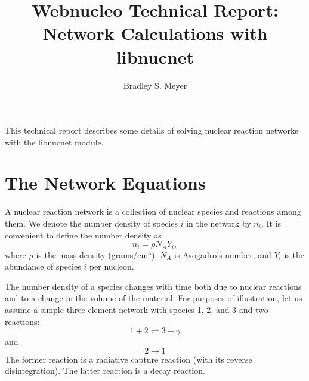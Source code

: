\documentclass{article}    %
\title{Webnucleo Technical Report: Network Calculations with libnucnet}  %
\author{Bradley S. Meyer}
\begin{document}

\maketitle                 %


This technical report describes some details of solving nuclear
reaction networks with the libnucnet module.

\section{The Network Equations}

A nuclear reaction network is a collection of nuclear species and
reactions among them.  We denote the number density of species $i$
in the network by $n_i$.  It is convenient to define the number
density as
\begin{equation}
n_i = \rho N_A Y_i,  \label{eq:abund}
\end{equation}
where $\rho$ is the mass density (grams/cm$^3$), $N_A$ is Avogadro's
number, and $Y_i$ is the abundance of species $i$ per nucleon.

The number density of a species changes with time both due to
nuclear reactions and to a change in the volume of the material. For
purposes of illustration, let us assume a simple three-element
network with species 1, 2, and 3 and two reactions:
\begin{equation}
1 + 2 \rightleftharpoons 3 + \gamma \label{eq:reaction1}
\end{equation}
and
\begin{equation}
2 \to 1  \label{eq:reaction2}
\end{equation}
The former reaction is a radiative capture reaction (with its
reverse disintegration).  The latter reaction is a decay reaction.
\end{document}
